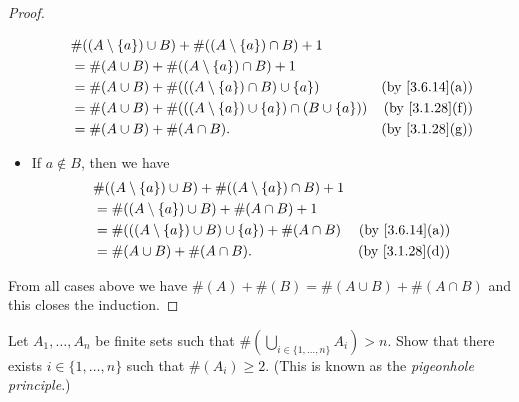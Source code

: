 \begin{proof}
\begin{itemize}
\begin{align*}
             & \#((A \setminus \{a\}) \cup B) + \#((A \setminus \{a\}) \cap B) + 1                                      \\
             & = \#(A \cup B) + \#((A \setminus \{a\}) \cap B) + 1                                                      \\
             & = \#(A \cup B) + \#(((A \setminus \{a\}) \cap B) \cup \{a\})              & \text{(by \cref{3.6.14}(a))} \\
             & = \#(A \cup B) + \#(((A \setminus \{a\}) \cup \{a\}) \cap (B \cup \{a\})) & \text{(by \cref{3.1.28}(f))} \\
             & = \#(A \cup B) + \#(A \cap B).                                            & \text{(by \cref{3.1.28}(g))}
          \end{align*}
    \item If \(a \notin B\), then we have
          \begin{align*}
             & \#((A \setminus \{a\}) \cup B) + \#((A \setminus \{a\}) \cap B) + 1                                \\
             & = \#((A \setminus \{a\}) \cup B) + \#(A \cap B) + 1                                                \\
             & = \#(((A \setminus \{a\}) \cup B) \cup \{a\}) + \#(A \cap B)        & \text{(by \cref{3.6.14}(a))} \\
             & = \#(A \cup B) + \#(A \cap B).                                      & \text{(by \cref{3.1.28}(d))}
          \end{align*}
  \end{itemize}
  From all cases above we have \(\#(A) + \#(B) = \#(A \cup B) + \#(A \cap B)\) and this closes the induction.
\end{proof}

\begin{ex}\label{ex:3.6.10}
  Let \(A_1, \dots, A_n\) be finite sets such that \(\#(\bigcup_{i \in \{1, \dots, n\}} A_i) > n\).
  Show that there exists \(i \in \{1, \dots, n\}\) such that \(\#(A_i) \geq 2\).
  (This is known as the \emph{pigeonhole principle}.)
\end{ex}

